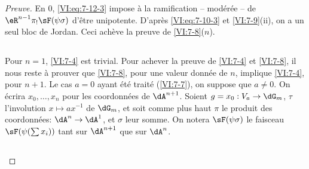 \documentclass[oneside]{book}
\theoremstyle{sga-source}
\theoremstyle{sga-source-dash}
\theoremstyle{sga-source-dotdash}
\theoremstyle{sga-source-number-note-dash}
\theoremstyle{sga-source-note-number-dotdash}
\theoremstyle{sga-source-example-dotdash}
\theoremstyle{sga-source-inline-number}
\theoremstyle{sga-source-bare-number}
\theoremstyle{sga-source}
\newcommand{\PrintPage}[1]{}\newcommand{\MathPage}[1]{}\newcommand{\PrintCite}[2]{#1}\newcommand{\var}[3]{#2}
\begin{document}
\begin{proof}[Preuve]
En $0$, \eqref{VI:eq:7-12-3} impose à la ramification -- modérée -- de 
\var{$\eR^{n-1} \pi_! \sF(\psi\sigma)$ être unipotente}{$\eR^{n-1} \pi_! \sF(\psi\sigma)$ d'être unipotente}{S45-SOL-0945}. D'après 
\eqref{VI:eq:7-10-3} et \ref{VI:7-9}(ii), on a un seul bloc de Jordan. Ceci 
achève la preuve de \ref{VI:7-8}($n$). 





\PrintPage{225}
\subsection{}\label{VI:7-13}

Pour $n=1$, \ref{VI:7-4} est trivial. Pour achever la preuve de \ref{VI:7-4} et 
\ref{VI:7-8}, il nous reste à prouver que \ref{VI:7-8}, pour une valeur 
donnée de $n$, implique \ref{VI:7-4}, pour $n+1$. Le cas $a=0$ ayant été 
traité (\ref{VI:7-7}), on suppose que $a\ne 0$. On écrira $x_0,\dots,x_n$ pour 
les coordonnées de $\dA^{n+1}$. Soient $g=x_0:V_a\to \dG_m$, $\tau$ 
l'involution $x\mapsto a x^{-1}$ de $\dG_m$, et soit comme plus haut $\pi$ le 
produit des coordonnées: $\dA^n \to \dA^1$, et $\sigma$ leur somme. On 
notera $\sF(\psi\sigma)$ le faisceau $\sF(\psi(\sum x_i))$ tant sur $\dA^{n+1}$ 
que sur $\dA^n$. 





\subsection{}\label{VI:7-14}


\end{proof}
\end{document}
